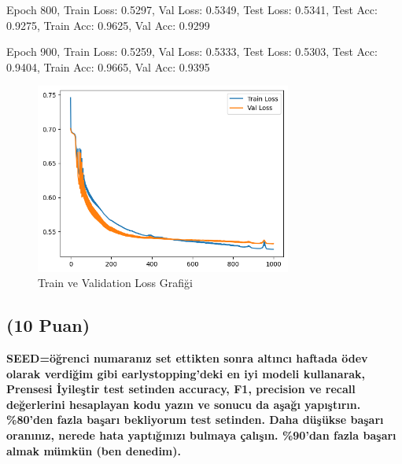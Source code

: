 \documentclass[11pt]{article}
\begin{document}
Epoch 800, Train Loss: 0.5297, Val Loss: 0.5349, Test Loss: 0.5341, Test Acc: 0.9275, Train Acc: 0.9625, Val Acc: 0.9299

Epoch 900, Train Loss: 0.5259, Val Loss: 0.5333, Test Loss: 0.5303, Test Acc: 0.9404, Train Acc: 0.9665, Val Acc: 0.9395

\begin{figure}[ht!]
    \centering
    \includegraphics[width=0.75\textwidth]{ysa.png}
    \caption{Train ve Validation Loss Grafiği}
    \label{fig:my_pic}
\end{figure}
\newpage


\subsection{(10 Puan)} \textbf{SEED=öğrenci numaranız set ettikten sonra altıncı haftada ödev olarak verdiğim gibi earlystopping'deki en iyi modeli kullanarak, Prensesi İyileştir test setinden accuracy, F1, precision ve recall değerlerini hesaplayan kodu yazın ve sonucu da aşağı yapıştırın. \%80'den fazla başarı bekliyorum test setinden. Daha düşükse başarı oranınız, nerede hata yaptığınızı bulmaya çalışın. \%90'dan fazla başarı almak mümkün (ben denedim).}
\end{document}
